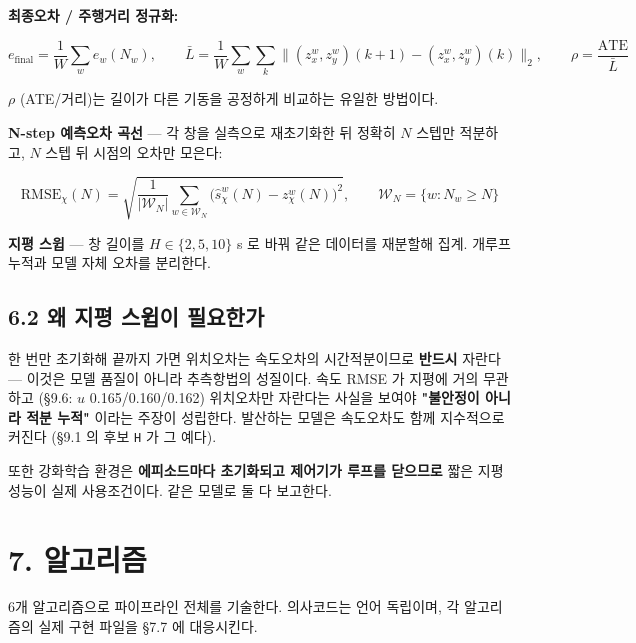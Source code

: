 \documentclass[10pt,a4paper]{article}
\begin{document}
\textbf{최종오차 / 주행거리 정규화:}

\begin{equation*}
e_{\text{final}} = \frac{1}{W}\sum_w e_w(N_w),
\qquad
\bar{L} = \frac{1}{W}\sum_w \sum_k
\big\|(z^w_x, z^w_y)(k{+}1) - (z^w_x, z^w_y)(k)\big\|_2,
\qquad
\rho = \frac{\mathrm{ATE}}{\bar{L}} \tag{42}
\end{equation*}

$\rho$ (ATE/거리)는 길이가 다른 기동을 공정하게 비교하는 유일한 방법이다.

\textbf{N-step 예측오차 곡선} --- 각 창을 실측으로 재초기화한 뒤 정확히 $N$ 스텝만 적분하고, $N$ 스텝 뒤 시점의 오차만 모은다:

\begin{equation*}
\mathrm{RMSE}_\chi(N) = \sqrt{\frac{1}{|\mathcal{W}_N|}
\sum_{w \in \mathcal{W}_N} \big(\hat{s}^w_\chi(N) - z^w_\chi(N)\big)^2},
\qquad
\mathcal{W}_N = \{w : N_w \ge N\} \tag{43}
\end{equation*}

\textbf{지평 스윕} --- 창 길이를 $H \in \{2, 5, 10\}$ s 로 바꿔 같은 데이터를 재분할해 집계. 개루프 누적과 모델 자체 오차를 분리한다.

\subsection*{6.2 왜 지평 스윕이 필요한가}

한 번만 초기화해 끝까지 가면 위치오차는 속도오차의 시간적분이므로 \textbf{반드시} 자란다 --- 이것은 모델 품질이 아니라 추측항법의 성질이다. 속도 RMSE 가 지평에 거의 무관하고 (\S{}9.6: $u$ 0.165/0.160/0.162) 위치오차만 자란다는 사실을 보여야 \textbf{"불안정이 아니라 적분 누적"} 이라는 주장이 성립한다. 발산하는 모델은 속도오차도 함께 지수적으로 커진다 (\S{}9.1 의 후보 \texttt{H} 가 그 예다).

또한 강화학습 환경은 \textbf{에피소드마다 초기화되고 제어기가 루프를 닫으므로} 짧은 지평 성능이 실제 사용조건이다. 같은 모델로 둘 다 보고한다.

\section*{7. 알고리즘}

6개 알고리즘으로 파이프라인 전체를 기술한다. 의사코드는 언어 독립이며, 각 알고리즘의 실제 구현 파일을 \S{}7.7 에 대응시킨다.
\end{document}
